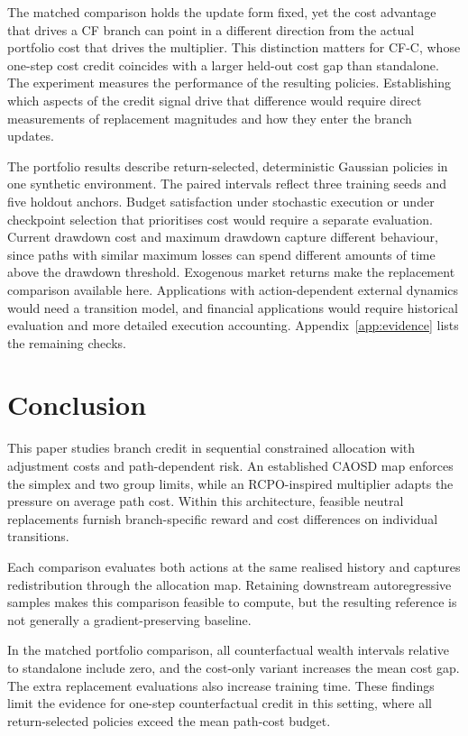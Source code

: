 \documentclass[10pt]{article}
\begin{document}
The matched comparison holds the update form fixed, yet the cost advantage that drives a CF branch can point in a different direction from the actual portfolio cost that drives the multiplier. This distinction matters for CF-C, whose one-step cost credit coincides with a larger held-out cost gap than standalone. The experiment measures the performance of the resulting policies. Establishing which aspects of the credit signal drive that difference would require direct measurements of replacement magnitudes and how they enter the branch updates.

The portfolio results describe return-selected, deterministic Gaussian policies in one synthetic environment. The paired intervals reflect three training seeds and five holdout anchors. Budget satisfaction under stochastic execution or under checkpoint selection that prioritises cost would require a separate evaluation. Current drawdown cost and maximum drawdown capture different behaviour, since paths with similar maximum losses can spend different amounts of time above the drawdown threshold. Exogenous market returns make the replacement comparison available here. Applications with action-dependent external dynamics would need a transition model, and financial applications would require historical evaluation and more detailed execution accounting. Appendix~\ref{app:evidence} lists the remaining checks.

\section{Conclusion}
\label{sec:conclusion}

This paper studies branch credit in sequential constrained allocation with adjustment costs and path-dependent risk. An established CAOSD map enforces the simplex and two group limits, while an RCPO-inspired multiplier adapts the pressure on average path cost. Within this architecture, feasible neutral replacements furnish branch-specific reward and cost differences on individual transitions.

Each comparison evaluates both actions at the same realised history and captures redistribution through the allocation map. Retaining downstream autoregressive samples makes this comparison feasible to compute, but the resulting reference is not generally a gradient-preserving baseline.

In the matched portfolio comparison, all counterfactual wealth intervals relative to standalone include zero, and the cost-only variant increases the mean cost gap. The extra replacement evaluations also increase training time. These findings limit the evidence for one-step counterfactual credit in this setting, where all return-selected policies exceed the mean path-cost budget.
\end{document}
